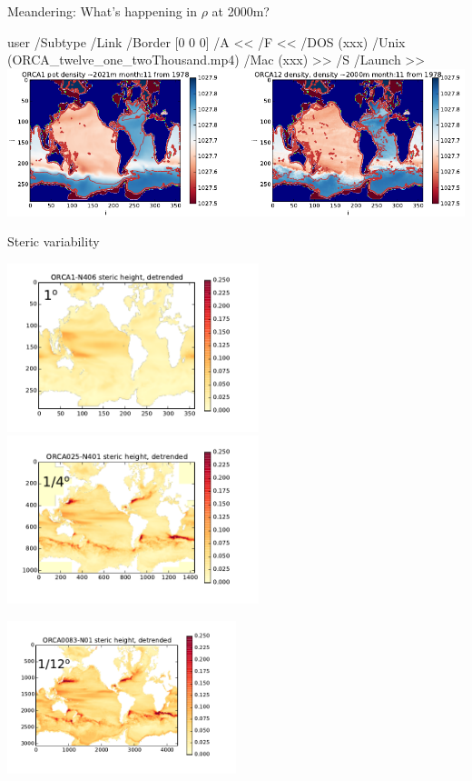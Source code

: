 \documentclass{beamer}
\newcommand{\LaunchBinary}[2]{%
  \leavevmode%
  \pdfstartlink user {
    /Subtype /Link
    /Border [0 0 0]%
    /A <<
      /F <<
         /DOS (xxx)
         /Unix (#1)
         /Mac (xxx)
      >>
      /S /Launch
    >>
  }#2%
  \pdfendlink%
}
\begin{document}
\begin{frame}{Meandering: What's happening in $\rho$ at 2000m?}
\begin{center}
\LaunchBinary{ORCA_twelve_one_twoThousand.mp4}{\includegraphics[width=1\textwidth]{rho2000.png}}%
\end{center}
\end{frame}




\begin{frame}{Steric variability}
\begin{center}
\vspace{-0.9cm}
\includegraphics[width=0.55\textwidth]{ORCA1_Std_SH_P.png}
\includegraphics[width=0.55\textwidth]{ORCA025_Std_SH_P.png}\\
\vspace{-0.4cm}

\includegraphics[width=0.5\textwidth]{ORCA12_Std_SH_P.png}
\end{center}
\end{frame}
\end{document}
